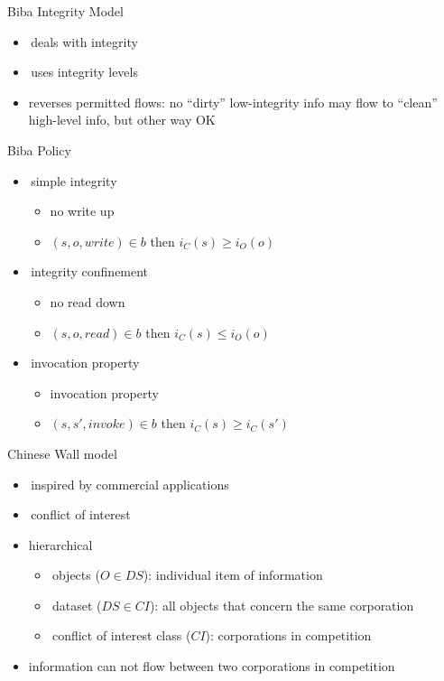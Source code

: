 \documentclass{beamer}
\begin{document}
\begin{frame}{Biba Integrity Model}
  \begin{itemize}
    \item deals with integrity
    \item uses integrity levels
    \item reverses permitted flows: 
      no ``dirty'' low-integrity info may flow to ``clean'' 
      high-level info, but other way OK
  \end{itemize}
\end{frame}

\begin{frame}{Biba Policy}
  \begin{itemize}
    \item simple integrity
      \begin{itemize}
      \item no write up
      \item $(s, o, write) \in b$ then
        $i_C(s) \ge i_O(o)$
      \end{itemize}
    \item<2-> integrity confinement
      \begin{itemize}
      \item no read down
      \item $(s, o, read) \in b$ then
        $i_C(s) \le i_O(o)$
      \end{itemize}
    \item<3-> invocation property
      \begin{itemize}
      \item invocation property
      \item $(s, s', invoke) \in b$ then
        $i_C(s) \ge i_C(s')$
      \end{itemize}
  \end{itemize}
\end{frame}

\begin{frame}{Chinese Wall model}
  \begin{itemize}
    \item inspired by commercial applications
    \item conflict of interest
    \item hierarchical
      \begin{itemize}
      \item objects ($O \in DS$): individual item of information
      \item dataset ($DS \in CI$): all objects that concern the same corporation
      \item conflict of interest class ($CI$): corporations in competition
      \end{itemize}
    \item information can not flow between two corporations in competition
  \end{itemize}
\end{frame}
\end{document}
